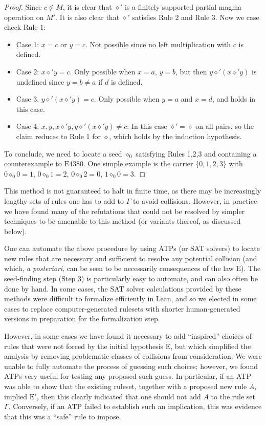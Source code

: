 \documentclass[12pt]{amsart}
\theoremstyle{definition}
\newcommand{\op}{\diamond}
\newcommand{\Eq}[1]{\mathrm{E}#1}
\newcommand{\E}{\mathrm{E}}
\begin{document}
\begin{proof}
Since $c \not \in M$, it is clear that $\op'$ is a finitely supported partial magma operation on $M'$.  It is also clear that $\op'$ satisfies Rule 2 and Rule 3.   Now we case check Rule 1:
\begin{itemize}
\item Case 1: $x=c$ or $y=c$.  Not possible since no left multiplication with $c$ is defined.
\item Case 2: $x \op' y = c$.  Only possible when $x = a$, $y = b$, but then $y \op' (x \op' y)$ is undefined since $y = b \neq a$ if $d$ is defined.
\item Case 3. $y \op' (x \op' y) = c$.  Only possible when $y=a$ and $x=d$, and holds in this case.
\item Case 4: $x, y, x \op' y, y \op' (x \op' y) \neq c$: In this case $\op'=\op$ on all pairs, so the claim reduces to Rule 1 for $\op$, which holds by the induction hypothesis.
\end{itemize}
To conclude, we need to locate a seed $\op_0$ satisfying Rules 1,2,3 and containing a counterexample to $\Eq{4380}$.  One simple example is the carrier $\{0,1,2,3\}$ with $0 \op_0 0 = 1$, $0 \op_0 1 = 2$, $0 \op_0 2 = 0$, $1 \op_0 0 = 3$.
\end{proof}

This method is not guaranteed to halt in finite time, as there may be increasingly lengthy sets of rules one has to add to $\Gamma$ to avoid collisions.  However, in practice we have found many of the refutations that could not be resolved by simpler techniques to be amenable to this method (or variants thereof, as discussed below).

One can automate the above procedure by using ATPs (or SAT solvers) to locate new rules that are necessary and sufficient to resolve any potential collision (and which, \emph{a posteriori}, can be seen to be necessarily consequences of the law $\E$).  The seed-finding step (Step 3) is particularly easy to automate, and can also often be done by hand.  In some cases, the SAT solver calculations provided by these methods were difficult to formalize efficiently in Lean, and so we elected in some cases to replace computer-generated rulesets with shorter human-generated versions in preparation for the formalization step.

However, in some cases we have found it necessary to add ``inspired'' choices of rules that were not forced by the initial hypothesis $\E$, but which simplified the analysis by removing problematic classes of collisions from consideration.  We were unable to fully automate the process of guessing such choices; however, we found ATPs very useful for testing any proposed such guess.  In particular, if an ATP was able to show that the existing ruleset, together with a proposed new rule $A$, implied ${\E'}$, then this clearly indicated that one should not add $A$ to the rule set $\Gamma$.  Conversely, if an ATP failed to establish such an implication, this was evidence that this was a ``safe'' rule to impose.
\end{document}
